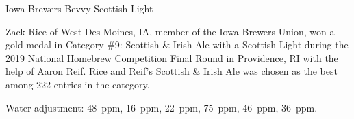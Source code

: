 \stylesection{\stylescottishlight}

\begin{recipe}{Iowa Brewers Bevvy Scottish Light}

\begin{aboutblock}
Zack Rice of West Des Moines, IA, member of the Iowa Brewers Union, won a gold
medal in Category \#9: Scottish \& Irish Ale with a Scottish Light during the
2019 National Homebrew Competition Final Round in Providence, RI with the help
of Aaron Reif. Rice and Reif's Scottish \& Irish Ale was chosen as the best among
222 entries in the category.
\end{aboutblock}


\begin{methodandtiming}
 
\begin{mashsteps}
\end{mashsteps}

\begin{fermentationsteps}
\end{fermentationsteps}

\begin{directions}
Water adjustment:  48~ppm,  16~ppm,  22~ppm,  75~ppm,
 46~ppm,  36~ppm.
\end{directions}

\end{methodandtiming}

\recipebreak

\begin{ingredientsblock}

\begin{malts}
\end{malts}

\begin{hops}
\end{hops}

\begin{yeasts}
\end{yeasts}

\end{ingredientsblock}

\end{recipe}
